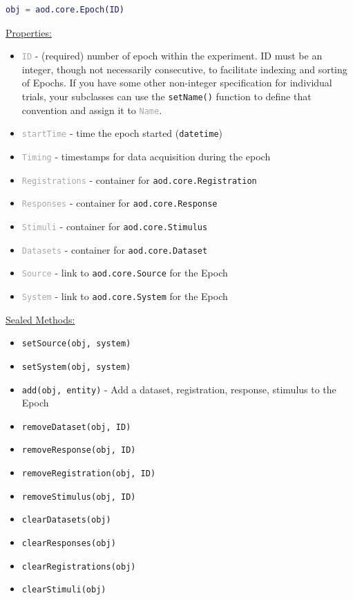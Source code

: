 \documentclass[10pt]{exam}
\newcommand\aodclass[1]{\textcolor{codeblue}{\texttt{#1}}}
\newcommand\aodprop[1]{\textcolor{darkgray}{\texttt{#1}}}
\newcommand\aodfcn[1]{\textcolor{darkteal}{\texttt{#1}}}
\newcommand\docheader[1]{\vspace{0.6ex}\noindent\underline{#1}\vspace{0.15ex}}
\begin{document}
		\begin{lstlisting}[language=matlab]
obj = aod.core.Epoch(ID)
		\end{lstlisting}
		\docheader{Properties:}
		\begin{itemize}
			\item \aodprop{ID} - (required) number of epoch within the experiment. ID must be an integer, though not necessarily consecutive, to facilitate indexing and sorting of Epochs. If you have some other non-integer specification for individual trials, your subclasses can use the \aodfcn{setName()} function to define that convention and assign it to \aodprop{Name}. 
			\item \aodprop{startTime} - time the epoch started (\aodclass{datetime})
			\item \aodprop{Timing} - timestamps for data acquisition during the epoch
			\item \aodprop{Registrations} - container for \aodclass{aod.core.Registration}
			\item \aodprop{Responses} - container for \aodclass{aod.core.Response}
			\item \aodprop{Stimuli} - container for \aodclass{aod.core.Stimulus}
			\item \aodprop{Datasets} - container for \aodclass{aod.core.Dataset}
			\item \aodprop{Source} - link to \aodclass{aod.core.Source} for the Epoch
			\item \aodprop{System} - link to \aodclass{aod.core.System} for the Epoch
		\end{itemize}	
		\docheader{Sealed Methods:}
		\begin{itemize}
			\item \aodfcn{setSource(obj, system)}
			\item \aodfcn{setSystem(obj, system)}
			\item \aodfcn{add(obj, entity)} - Add a dataset, registration, response, stimulus to the Epoch\\
			\item \aodfcn{removeDataset(obj, ID)}
			\item \aodfcn{removeResponse(obj, ID)}
			\item \aodfcn{removeRegistration(obj, ID)}
			\item \aodfcn{removeStimulus(obj, ID)}
			\item \aodfcn{clearDatasets(obj)}
			\item \aodfcn{clearResponses(obj)}
			\item \aodfcn{clearRegistrations(obj)}
			\item \aodfcn{clearStimuli(obj)}
		\end{itemize}	
\end{document}
